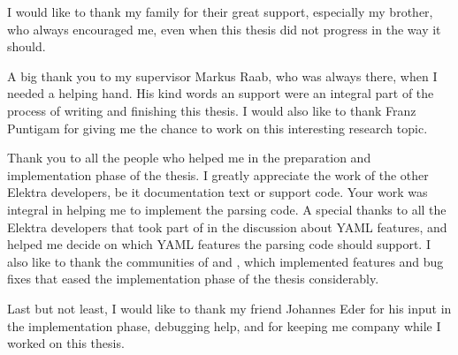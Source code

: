\begin{acknowledgements*}
I would like to thank my family for their great support, especially my brother, who always encouraged me, even when this thesis did not progress in the way it should.

A big thank you to my supervisor Markus Raab, who was always there, when I needed a helping hand. His kind words an support were an integral part of the process of writing and finishing this thesis. I would also like to thank Franz Puntigam for giving me the chance to work on this interesting research topic.

Thank you to all the people who helped me in the preparation and implementation phase of the thesis. I greatly appreciate the work of the other Elektra developers, be it documentation text or support code. Your work was integral in helping me to implement the parsing code. A special thanks to all the Elektra developers that took part of in the discussion about YAML features, and helped me decide on which YAML features the parsing code should support. I also like to thank the communities of  and , which implemented features and bug fixes that eased the implementation phase of the thesis considerably.

Last but not least, I would like to thank my friend Johannes Eder for his input in the implementation phase, debugging help, and for keeping me company while I worked on this thesis.
\end{acknowledgements*}
